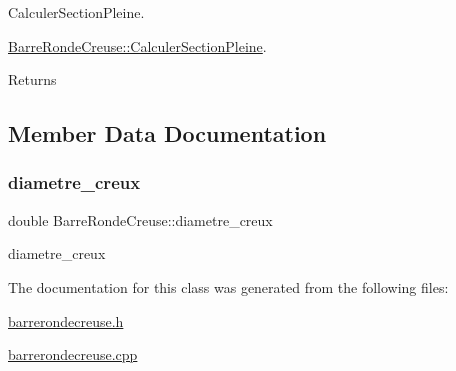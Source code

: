 Calculer\+Section\+Pleine. 

\hyperlink{class_barre_ronde_creuse_a4e5242dcbb3599a116b2a46855f7bc67}{Barre\+Ronde\+Creuse\+::\+Calculer\+Section\+Pleine}.

\begin{DoxyReturn}{Returns}

\end{DoxyReturn}


\subsection{Member Data Documentation}
\mbox{\label{class_barre_ronde_creuse_a624997b1f29c756ce2add4db820f59c1}} 
\subsubsection{\texorpdfstring{diametre\+\_\+creux}{diametre\_creux}}
{\footnotesize\ttfamily double Barre\+Ronde\+Creuse\+::diametre\+\_\+creux\hspace{0.3cm}{\ttfamily [private]}}



diametre\+\_\+creux 



The documentation for this class was generated from the following files\+:\begin{DoxyCompactItemize}
\item 
\hyperlink{barrerondecreuse_8h}{barrerondecreuse.\+h}\item 
\hyperlink{barrerondecreuse_8cpp}{barrerondecreuse.\+cpp}\end{DoxyCompactItemize}
